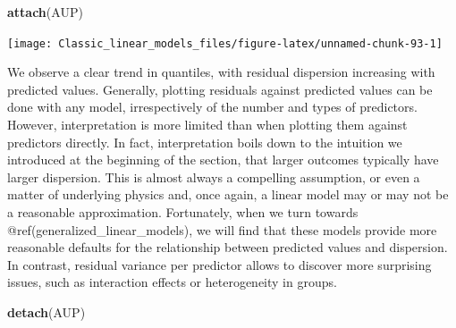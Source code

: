 \documentclass[]{svmono}
\newenvironment{Shaded}{\begin{snugshade}}{\end{snugshade}}
\newcommand{\KeywordTok}[1]{\textcolor[rgb]{0.13,0.29,0.53}{\textbf{#1}}}
\newcommand{\DataTypeTok}[1]{\textcolor[rgb]{0.13,0.29,0.53}{#1}}
\newcommand{\DecValTok}[1]{\textcolor[rgb]{0.00,0.00,0.81}{#1}}
\newcommand{\StringTok}[1]{\textcolor[rgb]{0.31,0.60,0.02}{#1}}
\newcommand{\OperatorTok}[1]{\textcolor[rgb]{0.81,0.36,0.00}{\textbf{#1}}}
\newcommand{\NormalTok}[1]{#1}
\begin{document}
\begin{Shaded}
\begin{Highlighting}[]
\KeywordTok{attach}\NormalTok{(AUP)}
\end{Highlighting}
\end{Shaded}

\begin{Shaded}
\end{Shaded}

\texttt{[image: Classic\_linear\_models\_files/figure-latex/unnamed-chunk-93-1]}

We observe a clear trend in quantiles, with residual dispersion
increasing with predicted values. Generally, plotting residuals against
predicted values can be done with any model, irrespectively of the
number and types of predictors. However, interpretation is more limited
than when plotting them against predictors directly. In fact,
interpretation boils down to the intuition we introduced at the
beginning of the section, that larger outcomes typically have larger
dispersion. This is almost always a compelling assumption, or even a
matter of underlying physics and, once again, a linear model may or may
not be a reasonable approximation. Fortunately, when we turn towards
@ref(generalized\_linear\_models), we will find that these models
provide more reasonable defaults for the relationship between predicted
values and dispersion. In contrast, residual variance per predictor
allows to discover more surprising issues, such as interaction effects
or heterogeneity in groups.

\begin{Shaded}
\begin{Highlighting}[]
\KeywordTok{detach}\NormalTok{(AUP)}
\end{Highlighting}
\end{Shaded}
\end{document}
